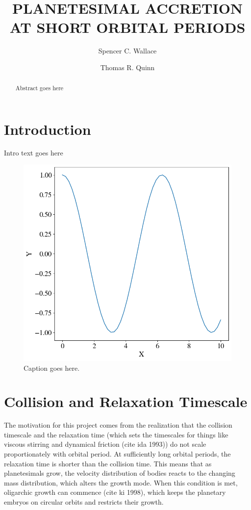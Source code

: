 \documentclass[onecolumn]{aastex63}
\begin{document}
\title{PLANETESIMAL ACCRETION AT SHORT ORBITAL PERIODS}

\author{Spencer C. Wallace}


\author{Thomas R. Quinn}

\begin{abstract}
Abstract goes here
\end{abstract}

\section{Introduction} \label{sec:intro}

Intro text goes here \citep{Wallace2019}

\begin{figure}
    \includegraphics[width=0.5\columnwidth]{figures/test.png}
    \caption{Caption goes here.\label{fig:test}}
\end{figure}

\section{Collision and Relaxation Timescale}

The motivation for this project comes from the realization that the collision timescale and the relaxation time (which sets the timescales for things like viscous stirring and dynamical friction (cite ida 1993)) do not scale proportionately with orbital period. At sufficiently long orbital periods, the relaxation time is shorter than the collision time. This means that as planetesimals grow, the velocity distribution of bodies reacts to the changing mass distribution, which alters the growth mode. When this condition is met, oligarchic growth can commence (cite ki 1998), which keeps the planetary embryos on circular orbits and restricts their growth.
\end{document}
